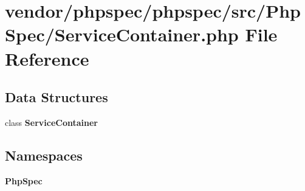 \section{vendor/phpspec/phpspec/src/\+Php\+Spec/\+Service\+Container.php File Reference}
\label{_service_container_8php}
\subsection*{Data Structures}
\begin{DoxyCompactItemize}
\item 
class {\bf Service\+Container}
\end{DoxyCompactItemize}
\subsection*{Namespaces}
\begin{DoxyCompactItemize}
\item 
 {\bf Php\+Spec}
\end{DoxyCompactItemize}
